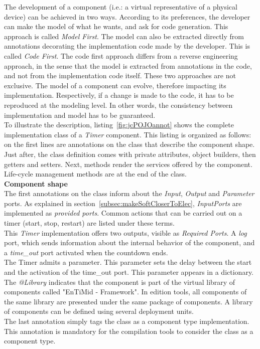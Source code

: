 The development of a component (i.e.: a virtual representative of a physical device) can be achieved in two ways. According to its preferences, the developer can make the model of what he wants, and ask for code generation. This approach is called {\it Model First}. The model can also be extracted directly from annotations decorating the implementation code made by the developer. This is called {\it Code First}. The code first approach differs from a reverse engineering approach, in the sense that the model is extracted from annotations in the code, and not from the implementation code itself. These two approaches are not exclusive. The model of a component can evolve, therefore impacting its implementation. Respectively, if a change is made to the code, it has to be reproduced at the modeling level. In other words, the consistency between implementation and model has to be guaranteed.\\

To illustrate the description, listing~\ref{fig:jcPOJOannot} shows the complete implementation class of a {\it Timer} component. This listing is organized as follows: on the first lines are annotations on the class that describe the component shape. Just after, the class definition comes with private attributes, object builders, then getters and setters. Next, methods render the services offered by the component. Life-cycle management methods are at the end of the class.\\

{\bf Component shape}\\
The first annotations on the class inform about the {\it Input}, {\it Output} and {\it Parameter} ports. As explained in section~\ref{subsec:makeSoftCloserToElec}, {\it InputPorts} are implemented as {\it provided ports}. Common actions that can be carried out on a timer (start, stop, restart) are listed under these terms.\\
This {\it Timer} implementation offers two outputs, visible as {\it Required Ports}. A {\it log} port, which sends information about the internal behavior of the component, and a {\it time\_out} port activated when the countdown ends.\\
The Timer admits a parameter. This parameter sets the delay between the start and the activation of the time\_out port. This parameter appears in a dictionary.\\
The {\it @Library} indicates that the component is part of the virtual library of components called "EnTiMid - Framework". In edition tools, all components of the same library are presented under the same package of components. A library of components can be defined using several deployment units.\\
The last annotation simply tags the class as a component type implementation. This annotation is mandatory for the compilation tools to consider the class as a component type.\\

